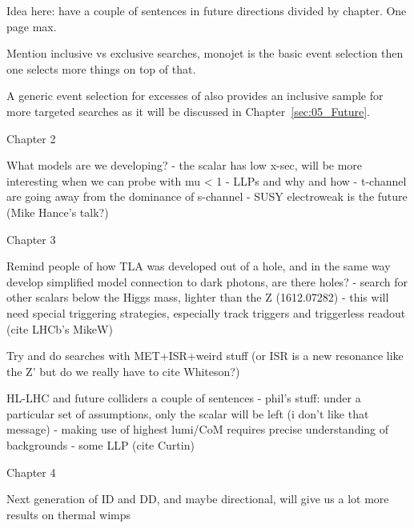 Idea here: have a couple of sentences in future directions divided by chapter. One page max. 

Mention inclusive vs exclusive searches, monojet is the basic event selection then one selects more things on top of that. 

A generic event selection for excesses of \MET also provides an inclusive sample for more targeted searches as it will be discussed in Chapter~\ref{sec:05_Future}. 

Chapter 2

What models are we developing? 
- the scalar has low x-sec, will be more interesting when we can probe with mu < 1 
- LLPs and why and how
- t-channel are going away from the dominance of s-channel
- SUSY electroweak is the future (Mike Hance's talk?)

Chapter 3

Remind people of how TLA was developed out of a hole, and in the same way develop simplified model connection to dark photons, are there holes?
- search for other scalars below the Higgs mass, lighter than the Z (1612.07282)
- this will need special triggering strategies, especially track triggers and triggerless readout (cite LHCb's MikeW)

Try and do searches with MET+ISR+weird stuff (or ISR is a new resonance like the Z' but do we really have to cite Whiteson?)

HL-LHC and future colliders a couple of sentences
- phil's stuff: under a particular set of assumptions, only the scalar will be left (i don't like that message)
- making use of highest lumi/CoM requires precise understanding of backgrounds
- some LLP (cite Curtin)

Chapter 4

Next generation of ID and DD, and maybe directional, will give us a lot more results on thermal wimps

